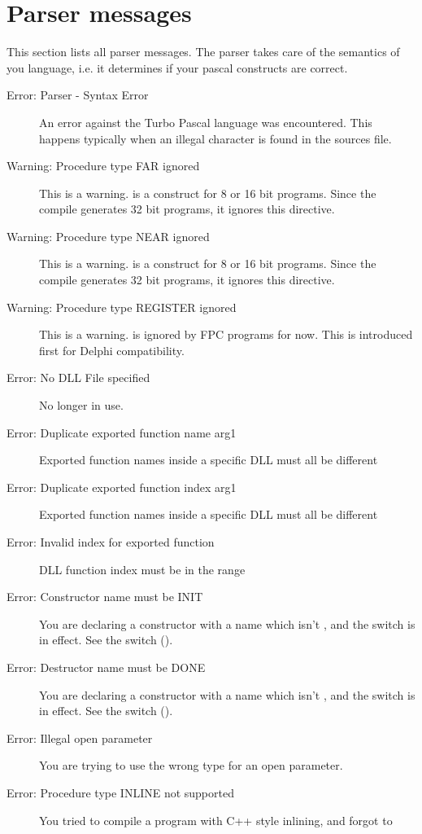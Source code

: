  \section{Parser messages}
 This section lists all parser messages. The parser takes care of the
 semantics of you language, i.e. it determines if your pascal constructs
 are correct.
 \begin{description}
\item [Error: Parser - Syntax Error]
 An error against the Turbo Pascal language was encountered. This happens
 typically when an illegal character is found in the sources file.
\item [Warning: Procedure type FAR ignored]
 This is a warning.  is a construct for 8 or 16 bit programs. Since
 the compile generates 32 bit programs, it ignores this directive.
\item [Warning: Procedure type NEAR ignored]
 This is a warning.  is a construct for 8 or 16 bit programs. Since
 the compile generates 32 bit programs, it ignores this directive.
\item [Warning: Procedure type REGISTER ignored]
 This is a warning.  is ignored by FPC programs for now.
 This is introduced first for Delphi compatibility.
\item [Error: No DLL File specified]
 No longer in use.
\item [Error: Duplicate exported function name arg1]
 Exported function names inside a specific DLL must all be different
\item [Error: Duplicate exported function index arg1]
 Exported function names inside a specific DLL must all be different
\item [Error: Invalid index for exported function]
 DLL function index must be in the range 
\item [Error: Constructor name must be INIT]
 You are declaring a constructor with a name which isn't , and the
  switch is in effect. See the  switch ().
\item [Error: Destructor name must be DONE]
 You are declaring a constructor with a name which isn't , and the
  switch is in effect. See the  switch ().
\item [Error: Illegal open parameter]
 You are trying to use the wrong type for an open parameter.
\item [Error: Procedure type INLINE not supported]
 You tried to compile a program with C++ style inlining, and forgot to

\end{description}
